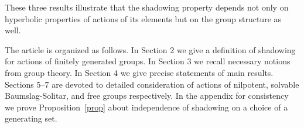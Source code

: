 These three results illustrate that the shadowing property depends not only on hyperbolic properties of actions of its elements but on the group structure as well.

The article is organized as follows. In Section 2 we give a definition of shadowing for actions of finitely generated groups. In Section 3 we recall necessary notions from group theory. In Section 4 we give precise statements of main results. Sections 5--7 are devoted to detailed consideration of actions of nilpotent, solvable Baumslag-Solitar, and free groups respectively.  In the appendix for consistency we prove Proposition~\ref{prop} about independence of shadowing on a choice of a generating set.

